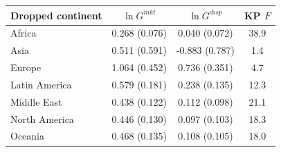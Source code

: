 \begin{tabular}{lccc}
\toprule
Dropped continent & $\ln G^{mkt}$ & $\ln G^{disp}$ & KP $F$ \\
\midrule
Africa & 0.268\sym{***} (0.076) & 0.040 (0.072) & 38.9 \\
Asia & 0.511 (0.591) & -0.883 (0.787) & 1.4 \\
Europe & 1.064\sym{**} (0.452) & 0.736\sym{**} (0.351) & 4.7 \\
Latin America & 0.579\sym{***} (0.181) & 0.238\sym{*} (0.135) & 12.3 \\
Middle East & 0.438\sym{***} (0.122) & 0.112 (0.098) & 21.1 \\
North America & 0.446\sym{***} (0.130) & 0.097 (0.103) & 18.3 \\
Oceania & 0.468\sym{***} (0.135) & 0.108 (0.105) & 18.0 \\
\bottomrule
\end{tabular}
